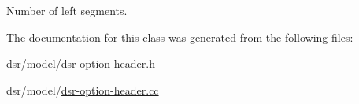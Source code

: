 Number of left segments. 



The documentation for this class was generated from the following files\+:\begin{DoxyCompactItemize}
\item 
dsr/model/\hyperlink{dsr-option-header_8h}{dsr-\/option-\/header.\+h}\item 
dsr/model/\hyperlink{dsr-option-header_8cc}{dsr-\/option-\/header.\+cc}\end{DoxyCompactItemize}
